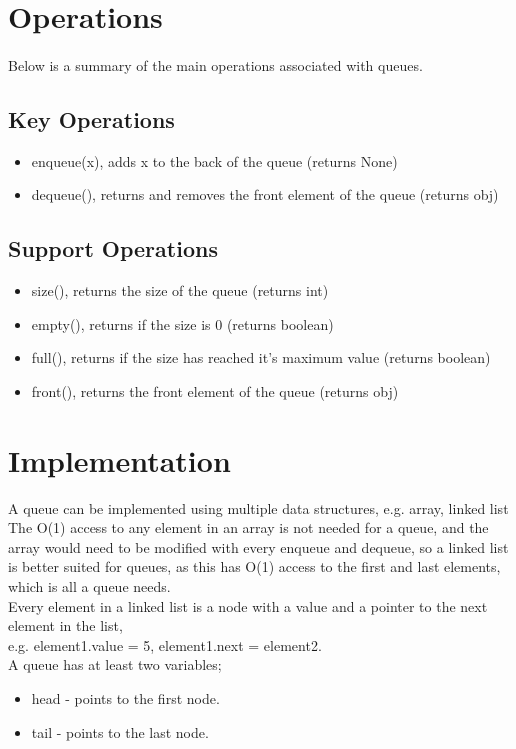 \documentclass[12pt]{article}
\begin{document}
\section{Operations}

\paragraph{} Below is a summary of the main operations associated with queues.

\subsection{Key Operations}
\begin{itemize}
\item enqueue(x), adds x to the back of the queue (returns None)
\item dequeue(), returns and removes the front element of the queue (returns obj)
\end{itemize}

\subsection{Support Operations}
\begin{itemize}
\item size(), returns the size of the queue (returns int)
\item empty(), returns if the size is 0 (returns boolean)
\item full(), returns if the size has reached it's maximum value (returns boolean)
\item front(), returns the front element of the queue (returns obj)
\end{itemize}

\section{Implementation}
A queue can be implemented using multiple data structures, e.g. array, linked list \\
The O(1) access to any element in an array is not needed for a queue, and the array would need to be modified with every enqueue and dequeue, so a linked list is better suited for queues, as this has O(1) access to the first and last elements, which is all a queue needs.\\
Every element in a linked list is a node with a value and a pointer to the next element in the list,\\ 
e.g. element1.value = 5, element1.next = element2.\\
A queue has at least two variables; 
\begin{itemize}
    \item head - points to the first node. 
    \item tail - points to the last node.
\end{itemize}
\end{document}
